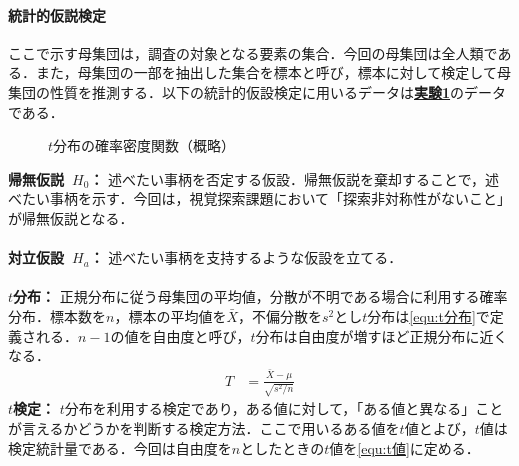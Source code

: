 \paragraph{統計的仮説検定}
ここで示す母集団は，調査の対象となる要素の集合．今回の母集団は全人類である．また，母集団の一部を抽出した集合を標本と呼び，標本に対して検定して母集団の性質を推測する．以下の統計的仮設検定に用いるデータは\textbf{\underline{実験1}}のデータである．
\begin{oframed}
    \begin{figure}
        \centering
        \caption{\(t\)分布の確率密度関数（概略）}
        \vspace{-.5cm}
    \end{figure}
    \noindent\textbf{帰無仮説\ \(H_0\)：} 述べたい事柄を否定する仮設．帰無仮説を棄却することで，述べたい事柄を示す．今回は，視覚探索課題において「探索非対称性がないこと」が帰無仮説となる．\\ \\
    \textbf{対立仮設\ \(H_a\)：} 述べたい事柄を支持するような仮設を立てる．\\ \\
    \textbf{\(t\)分布：} 正規分布に従う母集団の平均値，分散が不明である場合に利用する確率分布．標本数を\(n\)，標本の平均値を\(\bar{X}\)，不偏分散を\(s^2\)とし\(t\)分布は\eqref{equ:t分布}で定義される．\(n-1\)の値を自由度と呼び，\(t\)分布は自由度が増すほど正規分布に近くなる\cite[p.178\ -\ p.179]{応用解析と情報数学}．
    \begin{align}
        T & =\frac{\bar{X}-\mu}{\sqrt{s^2/n}}\label{equ:t分布}
    \end{align}
    \textbf{\(t\)検定：} \(t\)分布を利用する検定であり，ある値に対して，「ある値と異なる」ことが言えるかどうかを判断する検定方法．ここで用いるある値を\(t\)値とよび，\(t\)値は検定統計量である．今回は自由度を\(n\)としたときの\(t\)値を\eqref{equ:t値}に定める．

\end{oframed}
